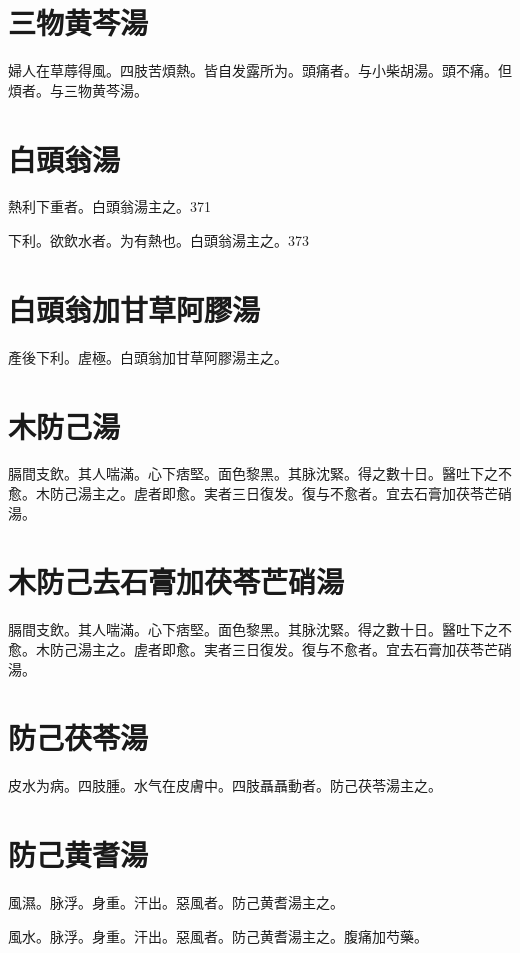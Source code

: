 \documentclass[12pt,twoside,UTF8,b5paper]{ctexbook}
\begin{document}
\section{三物黄芩湯}

婦人在草蓐得風。四肢苦煩熱。皆自发露所为。頭痛者。与小柴胡湯。頭不痛。但煩者。与三物黄芩湯。

\section{白頭翁湯}

熱利下重者。白頭翁湯主之。371

下利。欲飲水者。为有熱也。白頭翁湯主之。373

\section{白頭翁加甘草阿膠湯}

產後下利。虗極。白頭翁加甘草阿膠湯主之。

\section{木防己湯}

膈間支飲。其人喘滿。心下痞堅。面色黎黑。其脉沈緊。得之數十日。醫吐下之不愈。木防己湯主之。虗者即愈。実者三日復发。復与不愈者。宜去石膏加茯苓芒硝湯。

\section{木防己去石膏加茯苓芒硝湯}

膈間支飲。其人喘滿。心下痞堅。面色黎黑。其脉沈緊。得之數十日。醫吐下之不愈。木防己湯主之。虗者即愈。実者三日復发。復与不愈者。宜去石膏加茯苓芒硝湯。

\section{防己茯苓湯}

皮水为病。四肢腫。水气在皮膚中。四肢聶聶動者。防己茯苓湯主之。

\section{防己黄耆湯}

風濕。脉浮。身重。汗出。惡風者。防己黄耆湯主之。

風水。脉浮。身重。汗出。惡風者。防己黄耆湯主之。腹痛加芍藥。
\end{document}
